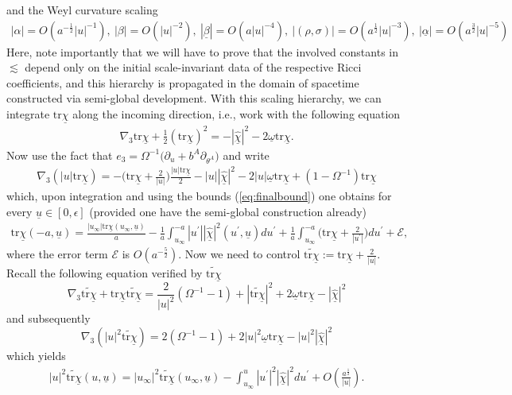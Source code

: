 \documentclass{amsart}
\newcommand{\omegabar}{\underline{\omega}}
\newcommand{\chibar}{\underline{\chi}}
\newcommand{\chibarhat}{\underline{\hat{\chi}}}
\newcommand{\ubar}{\underline{u}}
\newcommand{\alphabar}{\underline{\alpha}}
\newcommand{\betabar}{\underline{\beta}}
\newcommand{\tr}{\mbox{tr}}
\begin{document}
and the Weyl curvature scaling 
\begin{align}
    |\alpha|=O(a^{-\frac{1}{2}}|u|^{-1}),~|\beta|=O(|u|^{-2}),~|\betabar|=O(a|u|^{-4}),~|(\rho,\sigma)|=O(a^{\frac{1}{2}}|u|^{-3}),~|\alphabar|=O(a^{\frac{3}{2}}|u|^{-5})
\end{align}
Here, note importantly that we will have to prove that the involved constants in $\lesssim$ depend only on the initial scale-invariant data of the respective Ricci coefficients, and this hierarchy is propagated in the domain of spacetime constructed via semi-global development.  
 With this scaling hierarchy, we can integrate $\tr\chibar$ along the incoming direction, i.e., work with the following equation
\begin{align}
 \nabla_{3}\tr\chibar+\frac{1}{2}(\tr\chibar)^{2}=-|\chibarhat|^{2}-2\omegabar\tr\chibar.   
\end{align}
Now use the fact that $e_{3}=\Omega^{-1}\bigg(\partial_{u}+b^{A}\partial_{\theta^{A}}\bigg)$ and write
\begin{align}
 \nabla_{3}(|u|\tr\chibar)=-\bigg(\tr\chibar+\frac{2}{|u|}\bigg)\frac{|u|\tr\chibar}{2}-|u||\chibarhat|^{2}-2|u|\omegabar\tr\chibar+(1-\Omega^{-1})\tr\chibar   
\end{align}
which, upon integration and using the bounds (\ref{eq:finalbound}) 
one obtains for every $\ubar\in [0,\epsilon]$ (provided one have the semi-global construction already)
\begin{align}
\label{eq:fist1}
 \tr\chibar(-a,\ubar)=\frac{|u_{\infty}|\tr\chibar(u_{\infty},\ubar)}{a}-\frac{1}{a}\int_{u_{\infty}}^{-a}|u^{'}||\chibarhat|^{2}(u^{'},\ubar)du^{'}+\frac{1}{a}\int_{u_{\infty}}^{-a}\bigg(\tr\chibar+\frac{2}{|u^{'}|}\bigg)du^{'}+\mathscr{E},   
\end{align}
where the error term $\mathscr{E}$ is $O(a^{-\frac{5}{2}})$. Now we need to control $\widetilde{\tr\chibar}:=\tr\chibar+\frac{2}{|u|}$. Recall the following equation verified by $\widetilde{\tr\chibar}$
\[
\nabla_{3}\widetilde{\tr\chibar}+\tr\chibar\widetilde{\tr\chibar}=\frac{2}{|u|^{2}}(\Omega^{-1}-1)+|\widetilde{\tr\chibar}|^{2}+2\omegabar\tr\chibar-|\chibarhat|^{2}    
\]
and subsequently 
\[
 \nabla_{3}(|u|^{2}\widetilde{\tr\chibar})=2(\Omega^{-1}-1)+2|u|^{2}\omegabar\tr\chibar-|u|^{2}|\chibarhat|^{2}
\]
which yields 
\begin{align}
\label{eq:first2}
|u|^{2}\widetilde{\tr\chibar}(u,\ubar)=|u_{\infty}|^{2}\widetilde{\tr\chibar}(u_{\infty},\ubar)-\int_{u_{\infty}}^{u}|u^{'}|^{2}|\chibarhat|^{2}du^{'}+O(\frac{a^{\frac{1}{2}}}{|u|}).
\end{align}
\end{document}
